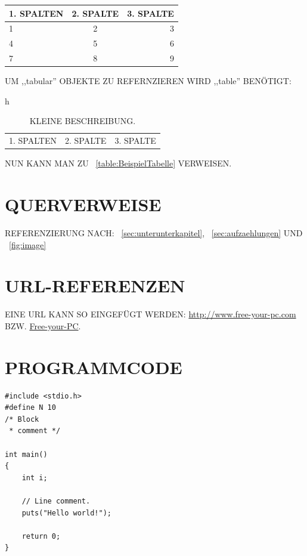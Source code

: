\documentclass[a4paper,12pt]{report}
\begin{document}
\begin{tabular}{ | l || c r | }
  1. SPALTEN & 2. SPALTE & 3. SPALTE \\
  \hline %
  \hline %
  1 & 2 & 3 \\
  \hline %
  4 & 5 & 6 \\
  \hline %
  7 & 8 & 9 \\
\end{tabular}

UM ,,tabular'' OBJEKTE ZU REFERNZIEREN WIRD ,,table'' BENÖTIGT:
\begin{table}{h}
  \caption[GROSZE BESCHREIBUNG]{KLEINE BESCHREIBUNG.}
  \begin{tabular}{ | l || c r | }
  1. SPALTEN & 2. SPALTE & 3. SPALTE \\
  \end{tabular}
  \label{table:BeispielTabelle}
\end{table}
\FloatBarrier %

NUN KANN MAN ZU ~\autoref{table:BeispielTabelle} VERWEISEN.

\section{QUERVERWEISE}
\thispagestyle{fancy} %
REFERENZIERUNG NACH: ~\autoref{sec:unterunterkapitel},
~\autoref{sec:aufzaehlungen} UND ~\autoref{fig:image}

\section{URL-REFERENZEN}
\thispagestyle{fancy} %
EINE URL KANN SO EINGEFÜGT WERDEN: \url{http://www.free-your-pc.com}
BZW. \href{http://www.free-your-pc.com}{Free-your-PC}.

\section{PROGRAMMCODE}
\thispagestyle{fancy} %


\begin{lstlisting}
#include <stdio.h>
#define N 10
/* Block
 * comment */

int main()
{
    int i;

    // Line comment.
    puts("Hello world!");

    return 0;
}
\end{lstlisting}
\end{document}
